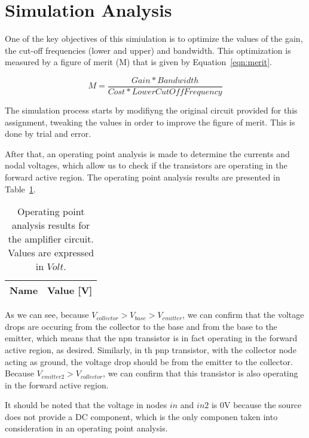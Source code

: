\section{Simulation Analysis}
\label{sec:simulation}

One of the key objectives of this simiulation is to optimize the values of the gain, the cut-off frequencies (lower and upper) and bandwidth. This optimization is measured by a figure of merit (M) that is given by Equation~\ref{eqn:merit}.

\begin{equation}
\label{eqn:merit}
M=\frac{Gain*Bandwidth}{Cost*LowerCutOffFrequency}
\end{equation}

The simulation process starts by modifiyng the original circuit provided for this assignment, tweaking the values in order to improve the figure of merit. This is done by trial and error.

After that, an operating point analysis is made to determine the currents and nodal voltages, which allow us to check if the transistors are operating in the forward active region.
The operating point analysis results are presented in Table~\ref{tab:opsim}.

\begin{table}[h]
  \centering
  \begin{tabular}{|l|r|}
    \hline    
	  {\bf Name} & {\bf Value [V]} \\ \hline
    
  \end{tabular}
  \caption{Operating point analysis results for the amplifier circuit. Values are expressed in $Volt$.}
  \label{tab:opsim}
\end{table}


As we can see, because $V_{collector} > V_{base} > V_{emitter}$, we can confirm that the voltage drops are occuring from the collector to the base and from the base to the emitter, which means that the npn transistor is in fact operating in the forward active region, as desired.
Similarly, in th pnp transistor, with the collector node acting as ground, the voltage drop should be from the emitter to the collector. Because $V_{emitter2} > V_{collector}$, we can confirm that this transistor is also operating in the forward active region.

It should be noted that the voltage in nodes $in$ and $in2$ is 0V because the source does not provide a DC component, which is the only componen taken into consideration in an operating point analysis.


